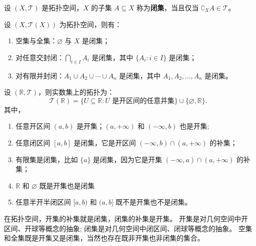 \begin{definition}
    设 $ (X,\mathcal{T}) $ 是拓扑空间，$ X $ 的子集 $ A\subseteq X $ 称为\textbf{闭集}，当且仅当 $ \complement_X A \in \mathcal{T} $。
    \label{definition:closed_set}
\end{definition}

\begin{proposition}[闭集的性质]
    设 $ (X,\mathcal{T}(X)) $ 为拓扑空间，则有：
    \begin{enumerate}
        \item 空集与全集：$ \varnothing $ 与 $ X $ 是闭集；
        \item 对任意交封闭：$ \bigcap_{i\in I} A_i $ 是闭集，其中 $ \{A_i:i\in I\}$ 是闭集；
        \item 对有限并封闭：$ A_1\cup A_2\cup \cdots \cup A_n $ 是闭集，其中 $ A_1,A_2,\ldots,A_n $ 是闭集。
    \end{enumerate}
\end{proposition}
\vspace{1em}

\begin{example}[实数集的拓扑]
    设 $(\mathbb{R},\mathcal{T})$，则实数集上的拓扑为：
    \[
        \mathcal{T}(\mathbb{R}) = \{U \subseteq \mathbb{R} : U \text{ 是开区间的任意并集}\} \cup \{\varnothing,\mathbb{R}\}.
    \]
    其中，
    \begin{enumerate}
        \item 任意开区间 $ (a,b) $ 是开集；$(a,+\infty)$ 和 $(-\infty,b)$ 也是开集;
        \item 任意闭区间 $ [a,b] $ 是闭集，它是开区间 $(-\infty,b)\cap(a,+\infty)$ 的补集；
        \item 有限集是闭集，比如 $\{a\}$ 是闭集，因为它是开集 $(-\infty,a)\cap(a,+\infty)$ 的补集；
        \item $\mathbb{R}$ 和 $\varnothing$ 既是开集也是闭集
        \item 任意半开半闭区间 $ [a,b) $ 和 $ (a,b] $ 既不是开集也不是闭集。
    \end{enumerate}
    \label{ex:topology_on_real_numbers}
\end{example}

\begin{note}
    在拓扑空间，开集的补集就是闭集，闭集的补集是开集。
    开集是对几何空间中开区间、开球等概念的抽象;
    闭集是对几何空间中闭区间、闭球等概念的抽象。
    空集和全集既是开集又是闭集，当然也存在既非开集也非闭集的集合。
\end{note}

